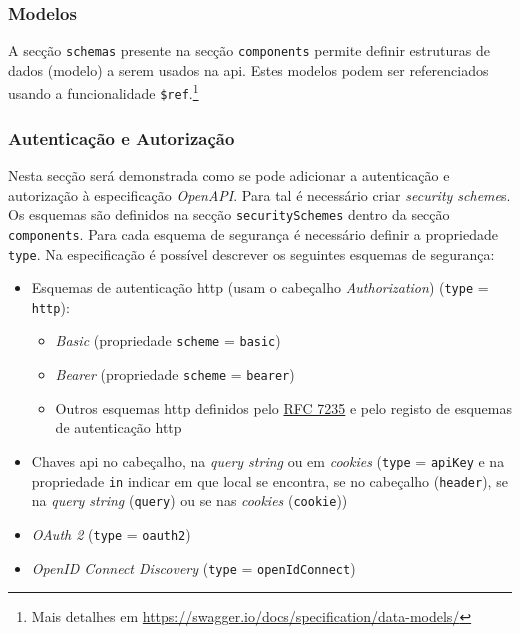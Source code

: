 \subsubsection{Modelos}
A secção \texttt{schemas} presente na secção \texttt{components} permite definir estruturas de dados (modelo) a serem usados na \acrshort{api}. Estes modelos podem ser referenciados usando a funcionalidade \texttt{\$ref}.\footnote{Mais detalhes em \url{https://swagger.io/docs/specification/data-models/}}

\subsubsection{Autenticação e Autorização}\label{sec:authSwagger}
Nesta secção será demonstrada como se pode adicionar a autenticação e autorização à especificação \textit{OpenAPI}. Para tal é necessário criar \textit{security scheme}s. Os esquemas são definidos na secção \texttt{securitySchemes} dentro da secção \texttt{components}. Para cada esquema de segurança é necessário definir a propriedade \texttt{type}. Na especificação é possível descrever os seguintes esquemas de segurança:
\begin{itemize}
    \item Esquemas de autenticação \acrshort{http} (usam o cabeçalho \textit{Authorization}) (\texttt{type} = \texttt{http}):
    \begin{itemize}
        \item \textit{Basic} (propriedade \texttt{scheme} = \texttt{basic})
        \item \textit{Bearer} (propriedade \texttt{scheme} = \texttt{bearer})
        \item Outros esquemas \acrshort{http} definidos pelo \href{https://tools.ietf.org/html/rfc7235}{RFC 7235} e pelo registo de esquemas de autenticação \acrshort{http}
    \end{itemize}
    \item Chaves \acrshort{api} no cabeçalho, na \textit{query string} ou em \textit{cookies} (\texttt{type} = \texttt{apiKey} e na propriedade \texttt{in} indicar em que local se encontra, se no cabeçalho (\texttt{header}), se na \textit{query string} (\texttt{query}) ou se nas \textit{cookies} (\texttt{cookie}))
    \item \textit{OAuth 2} (\texttt{type} = \texttt{oauth2})
    \item \textit{OpenID Connect Discovery} (\texttt{type} = \texttt{openIdConnect})
\end{itemize}

